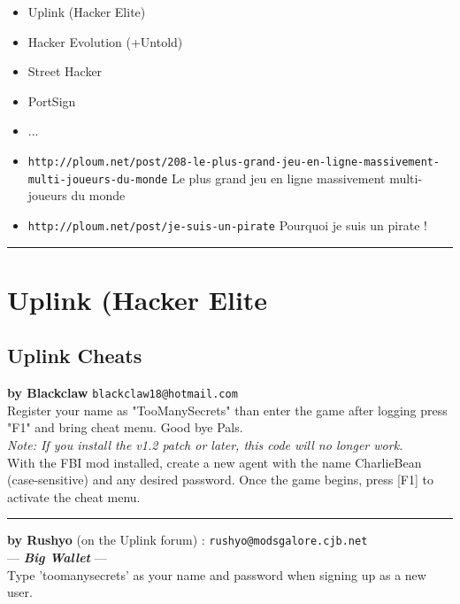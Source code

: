 \documentclass[11pt,twoside,a4paper]{book}
\begin{document}
\begin{itemize}
	\item Uplink (Hacker Elite)
	\item Hacker Evolution (+Untold)
	\item Street Hacker
	\item PortSign
	\item ...
	\item \texttt{http://ploum.net/post/208-le-plus-grand-jeu-en-ligne-massivement-multi-joueurs-du-monde} Le plus grand jeu en ligne massivement multi-joueurs du monde
	\item \texttt{http://ploum.net/post/je-suis-un-pirate} Pourquoi je suis un pirate !
\end{itemize}

\begin{center} \rule{0.45\textwidth}{0.01cm} \end{center}

\clearpage

\section{Uplink (Hacker Elite}

\subsection{Uplink Cheats}

\textbf{by Blackclaw} \texttt{blackclaw18@hotmail.com}~\\

Register your name as "TooManySecrets" than enter the game after logging press "F1" and bring cheat menu. Good bye Pals.~\\
\emph{Note: If you install the v1.2 patch or later, this code will no longer work.}~\\

With the FBI mod installed, create a new agent with the name CharlieBean (case-sensitive) and any desired password. Once the game begins, press [F1] to activate the cheat menu. %

\begin{center} \rule{0.85\textwidth}{0.01cm} \end{center}

\textbf{by Rushyo} (on the Uplink forum) : \texttt{rushyo@modsgalore.cjb.net}~\\

--- \textbf{\emph{Big Wallet}} --- ~\\
Type 'toomanysecrets' as your name and password when signing up as a new user. ~\\
\end{document}
